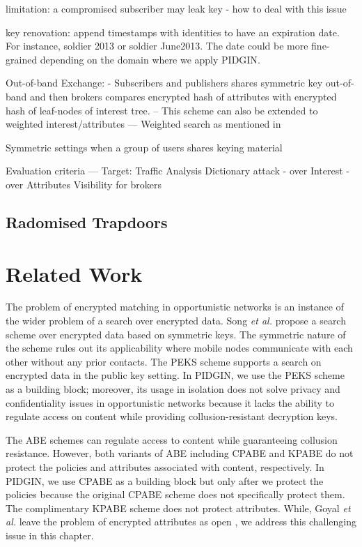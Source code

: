 \documentclass[epsfig,a4paper,11pt,titlepage]{book}
\numberwithin{algorithm}{chapter}
\begin{document}
limitation: a compromised subscriber may leak key - how to deal with this issue

key renovation: append timestamps with identities to have an expiration date.
For instance, soldier  2013 or soldier  June2013. The date could be more fine-grained depending on the domain where we apply \gls{PIDGIN}. 

Out-of-band Exchange:
- Subscribers and publishers shares symmetric key out-of-band and then brokers compares encrypted hash of attributes with encrypted hash of leaf-nodes of interest tree.
-- This scheme can also be extended to weighted interest/attributes
--- Weighted search as mentioned in \cite{Nordstrom:2009}

Symmetric settings when a group of users shares keying material

Evaluation criteria ---
Target: Traffic Analysis
Dictionary attack
- over Interest
- over Attributes
Visibility for brokers

\subsection{Radomised Trapdoors}

\fi

\section{Related Work}
\label{sec:pidgin-related-work}

The problem of encrypted matching in opportunistic networks is an instance of the wider problem of a search over encrypted data. Song \emph{et al.} \cite{Song:2000} propose a search scheme over encrypted data based on symmetric keys. The symmetric nature of the scheme rules out its applicability where mobile nodes communicate with each other without any prior contacts. The \gls{PEKS} scheme \cite{Boneh:2004} supports a search on encrypted data in the public key setting. In \gls{PIDGIN}, we use the \gls{PEKS} scheme as a building block; moreover, its usage in isolation does not solve privacy and confidentiality issues in opportunistic networks because it lacks the ability to regulate access on content while providing collusion-resistant decryption keys.

The \gls{ABE} schemes can regulate access to content while guaranteeing collusion resistance. However, both variants of \gls{ABE} including \gls{CPABE} \cite{Bethencourt:2007} and \gls{KPABE} \cite{Goyal:2006} do not protect the policies and attributes associated with content, respectively. In \gls{PIDGIN}, we use \gls{CPABE} \cite{Bethencourt:2007} as a building block but only after we protect the policies because the original \gls{CPABE} scheme does not specifically protect them. The complimentary \gls{KPABE} \cite{Goyal:2006} scheme does not protect attributes. While, Goyal \emph{et al.} leave the problem of encrypted attributes as open \cite{Goyal:2006}, we address this challenging issue in this chapter.
\end{document}
